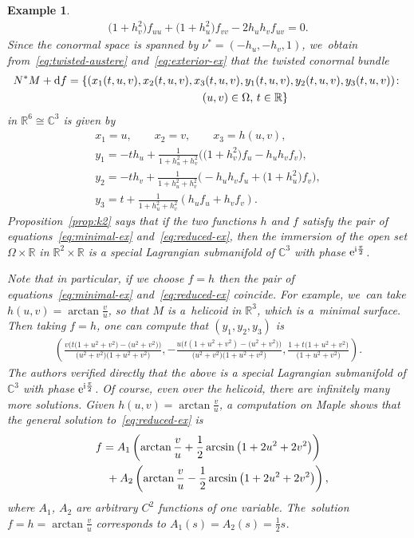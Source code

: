 \documentclass[10pt,a4paper]{amsart}
\def\R{\mathbb{R}}
\def\C{\mathbb{C}}
\newtheorem{Example}[Theorem]{Example}
\numberwithin{equation}{section}
\begin{document}
\begin{Example}
\begin{gather} \label{eq:reduced-ex}
\big(1 + h_v^2\big) f_{uu} + \big(1 + h_u^2\big) f_{vv} - 2 h_u h_v f_{uv} = 0.
\end{gather}
Since the conormal space is spanned by $\nu^* = (-h_u, -h_v, 1)$, we~obtain from~\eqref{eq:twisted-austere} and~\eqref{eq:exterior-ex} that the twisted conormal bundle
\begin{gather*}
N^* M + {\rm d} f = \{(x_1(t,u,v), x_2(t,u,v), x_3(t,u,v), y_1(t,u,v), y_2(t,u,v), y_3(t,u,v))\colon
\\ \hphantom{N^* M + {\rm d} f = \{}
(u,v) \in \Omega,\, t \in \R \}
\end{gather*}
in $\R^6 \cong \C^3$ is given by
\begin{gather*}
x_1 = u, \qquad
x_2 = v, \qquad
x_3 = h(u,v), \\
y_1 = -t h_u + \frac{1}{1 + h_u^2 + h_v^2} \big( \big(1 + h_v^2\big) f_u - h_u h_v f_v\big), \\
y_2 = -t h_v + \frac{1}{1 + h_u^2 + h_v^2} \big({-}h_u h_v f_u + \big(1 + h_u^2\big) f_v \big), \\
y_3 = t + \frac{1}{1 + h_u^2 + h_v^2} (h_u f_u + h_v f_v).
\end{gather*}
Proposition~\ref{prop:k2} says that if the two functions $h$ and $f$ satisfy the pair of equations~\eqref{eq:minimal-ex} and~\eqref{eq:reduced-ex}, then the immersion of the open set $\Omega \times \R$ in $\R^2 \times \R$ is a special Lagrangian submanifold of $\C^3$ with phase ${\rm e}^{{\rm i} \frac{\pi}{2}}$.

Note that in particular, if we choose $f=h$ then the pair of equations~\eqref{eq:minimal-ex} and~\eqref{eq:reduced-ex} coincide. For example, we~can take $h(u,v) = \arctan{\frac{v}{u}}$, so that $M$ is a~helicoid in $\R^3$, which is a~minimal surface. Then taking $f = h$, one can compute that $(y_1, y_2, y_3)$ is
\begin{gather*}
\left(\frac{v \big(t\big(1+u^2+v^2\big)-\big(u^2+v^2\big) \big)}{\big(u^2+v^2\big)\big(1+u^2+v^2\big)},
-\frac{u \big(t(1+u^2+v^2)-\big(u^2+v^2\big) \big)}{\big(u^2+v^2\big)\big(1+u^2+v^2\big)},
\frac{1 + t\big(1+u^2+v^2\big)}{\big(1+u^2+v^2\big)} \right).
\end{gather*}
The authors verified directly that the above is a special Lagrangian submanifold of $\C^3$ with phase ${\rm e}^{{\rm i} \frac{\pi}{2}}$. Of course, even over the helicoid, there are infinitely many more solutions. Given $h(u,v) = \arctan{\frac{v}{u}}$, a computation on Maple shows that the general solution to~\eqref{eq:reduced-ex} is
\begin{gather*}
f = A_1 \left( \arctan \frac{v}{u} + \frac{1}{2} \arcsin\big(1 + 2 u^2 + 2 v^2\big) \right)\\
\hphantom{f =}{}
 + A_2 \left( \arctan \frac{v}{u} - \frac{1}{2} \arcsin\big(1 + 2 u^2 + 2 v^2\big) \right),
\end{gather*}
where $A_1$, $A_2$ are arbitrary $C^2$ functions of one variable. The~solution $f=h=\arctan \frac{v}{u}$ corresponds to $A_1 (s) = A_2 (s) = \frac{1}{2} s$.
\end{Example}
\end{document}
